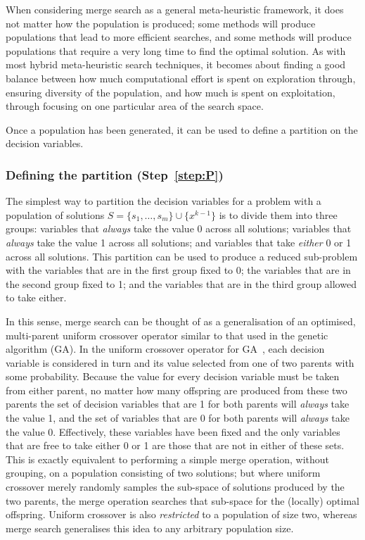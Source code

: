 \documentclass[preprint]{elsarticle}
\begin{document}
When considering merge search as a general meta-heuristic framework, it does not matter how the population is produced; some methods will produce populations that lead to more efficient searches, and some methods will produce populations that require a very long time to find the optimal solution. As with most hybrid meta-heuristic search techniques, it becomes about finding a good balance between how much computational effort is spent on exploration through, ensuring diversity of the population, and how much is spent on exploitation, through focusing on one particular area of the search space.

Once a population has been generated, it can be used to define a partition on the decision variables.

\subsubsection*{\textbf{Defining the partition (Step~\ref{step:P})}}

The simplest way to partition the decision variables for a problem with a population of solutions $S = \{s_1,\dots,s_m\}\cup \{x^{k-1}\}$ is to divide them into three groups: variables that \emph{always} take the value 0 across all solutions; variables that \emph{always} take the value 1 across all solutions; and variables that take \emph{either} 0 or 1 across all solutions. This partition can be used to produce a reduced sub-problem with the variables that are in the first group fixed to 0; the variables that are in the second group fixed to 1; and the variables that are in the third group allowed to take either.

In this sense, merge search can be thought of as a generalisation of an optimised, multi-parent uniform crossover operator similar to that used in the genetic algorithm (GA). In the uniform crossover operator for GA~\citep{meta-essentials}, each decision variable is considered in turn and its value selected from one of two parents with some probability. Because the value for every decision variable must be taken from either parent, no matter how many offspring are produced from these two parents the set of decision variables that are 1 for both parents will \emph{always} take the value 1, and the set of variables that are 0 for both parents will \emph{always} take the value 0. Effectively, these variables have been fixed and the only variables that are free to take either 0 or 1 are those that are not in either of these sets. This is exactly equivalent to performing a simple merge operation, without grouping, on a population consisting of two solutions; but where uniform crossover merely randomly samples the sub-space of solutions produced by the two parents, the merge operation searches that sub-space for the (locally) optimal offspring. Uniform crossover is also \emph{restricted} to a population of size two, whereas merge search generalises this idea to any arbitrary population size.
\end{document}
